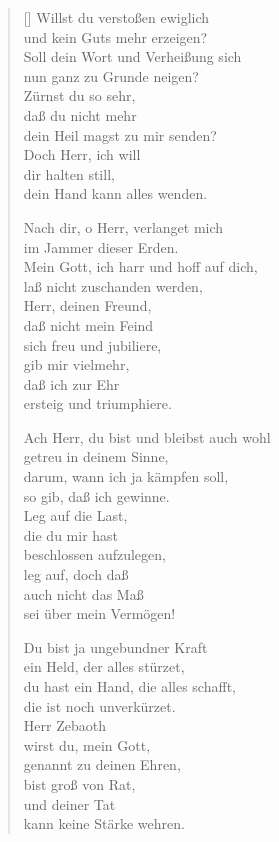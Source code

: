 \begin{multicols}{2}
\begin{verse}[\versewidth]
 Willst du verstoßen ewiglich\\
und kein Guts mehr erzeigen?\\
Soll dein Wort und Verheißung sich\\
nun ganz zu Grunde neigen?\\
Zürnst du so sehr,\\
daß du nicht mehr\\
dein Heil magst zu mir senden?\\
Doch Herr, ich will\\
dir halten still,\\
dein Hand kann alles wenden.

 Nach dir, o Herr, verlanget mich\\
im Jammer dieser Erden.\\
Mein Gott, ich harr und hoff auf dich,\\
laß nicht zuschanden werden,\\
Herr, deinen Freund,\\
daß nicht mein Feind\\
sich freu und jubiliere,\\
gib mir vielmehr,\\
daß ich zur Ehr\\
ersteig und triumphiere.

 Ach Herr, du bist und bleibst auch wohl\\
getreu in deinem Sinne,\\
darum, wann ich ja kämpfen soll,\\
so gib, daß ich gewinne.\\
Leg auf die Last,\\
die du mir hast\\
beschlossen aufzulegen,\\
leg auf, doch daß\\
auch nicht das Maß\\
sei über mein Vermögen!

 Du bist ja ungebundner Kraft\\
ein Held, der alles stürzet,\\
du hast ein Hand, die alles schafft,\\
die ist noch unverkürzet.\\
Herr Zebaoth\\
wirst du, mein Gott,\\
genannt zu deinen Ehren,\\
bist groß von Rat,\\
und deiner Tat\\
kann keine Stärke wehren.


\end{verse}
\end{multicols}
